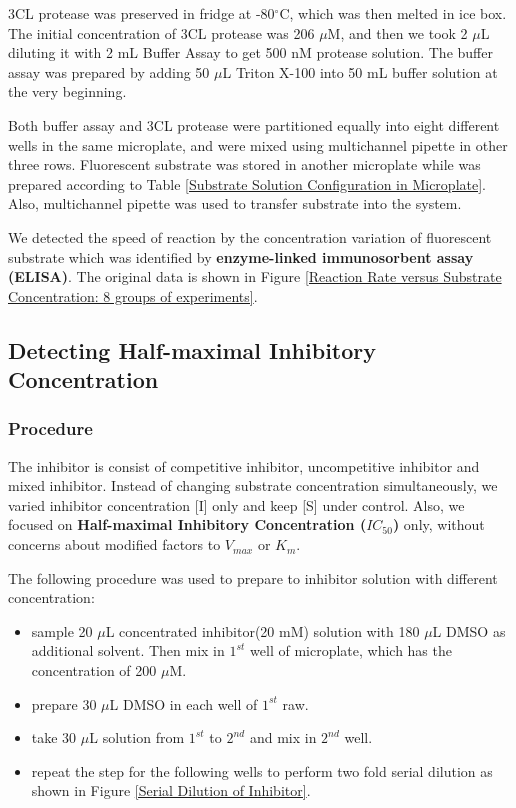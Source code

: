 \documentclass{report}
\begin{document}
3CL protease was preserved in fridge at -80$^\circ$C, which was then melted in ice box.
The initial concentration of 3CL protease was 206 $\mu$M, and then we took 2 $\mu$L diluting it with 2 mL Buffer Assay to get 500 nM protease solution.
The buffer assay was prepared by adding 50 $\mu$L Triton X-100 into 50 mL buffer solution at the very beginning.

Both buffer assay and 3CL protease were partitioned equally into eight different wells in the same microplate, and were mixed using multichannel pipette in other three rows.
Fluorescent substrate was stored in another microplate while was prepared according to Table \ref{Substrate Solution Configuration in Microplate}.
Also, multichannel pipette was used to transfer substrate into the system.

We detected the speed of reaction by the concentration variation of fluorescent substrate which was identified by \textbf{enzyme-linked immunosorbent assay (ELISA)}.
The original data is shown in Figure \ref{Reaction Rate versus Substrate Concentration: 8 groups of experiments}.

\subsection{Detecting Half-maximal Inhibitory Concentration}
\subsubsection{Procedure}
The inhibitor is consist of competitive inhibitor, uncompetitive inhibitor and mixed inhibitor.
Instead of changing substrate concentration simultaneously, we varied inhibitor concentration [I] only and keep [S] under control.
Also, we focused on \textbf{Half-maximal Inhibitory Concentration ($IC_{50}$)} only, without concerns about modified factors to $V_{max}$ or $K_m$.

The following procedure was used to prepare to inhibitor solution with different concentration:

\begin{itemize}
    \item sample 20 $\mu$L concentrated inhibitor(20 mM) solution with 180 $\mu$L DMSO as additional solvent. Then mix in $1^{st}$ well of microplate, which has the concentration of 200 $\mu$M.
    \item prepare 30 $\mu$L DMSO in each well of $1^{st}$ raw.
    \item take 30 $\mu$L solution from $1^{st}$ to $2^{nd}$ and mix in $2^{nd}$ well.
    \item repeat the step for the following wells to perform two fold serial dilution as shown in Figure \ref{Serial Dilution of Inhibitor}.
\end{itemize}
\end{document}
